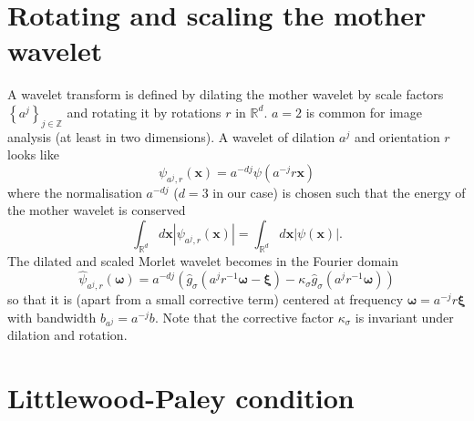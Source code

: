 \documentclass[twocolumn, openany, twoside, article]{memoir}
\begin{document}
\section{Rotating and scaling the mother wavelet}
A wavelet transform is defined by dilating the mother wavelet by scale factors $\left\{ a^j \right\}_{j \in \mathbb{Z}}$
and rotating it by rotations $r$ in $\mathbb{R}^d$. $a = 2$ is common for image analysis (at least in two dimensions).
A wavelet of dilation $a^j$ and orientation $r$ looks like
\begin{equation}
  \psi_{a^j, r}(\bm{x}) = a^{-dj} \psi(a^{-j}r\bm{x})
\end{equation}
where the normalisation $a^{-dj}$ ($d = 3$ in our case) is chosen such that the energy of the mother wavelet is conserved
\begin{equation}
  \int_{\mathbb{R}^d} d\bm{x} | \psi_{a^j, r}(\bm{x}) | = \int_{\mathbb{R}^d} d\bm{x} | \psi(\bm{x}) |.
\end{equation}
The dilated and scaled Morlet wavelet becomes in the Fourier domain
\begin{equation}
  \hat{\psi}_{a^j, r}(\bm{\omega}) = a^{-dj} \left( \hat{g}_{\sigma}(a^j r^{-1} \bm{\omega} - \bm{\xi}) - \kappa_{\sigma}\hat{g}_{\sigma}(a^j r^{-1} \bm{\omega}) \right)
\end{equation}
so that it is (apart from a small corrective term) centered at frequency $\bm{\omega} = a^{-j}r\bm{\xi}$
with bandwidth $b_{a^j} = a^{-j}b$. Note that the corrective factor $\kappa_{\sigma}$ is invariant under dilation and rotation.


\section{Littlewood-Paley condition}
\end{document}
